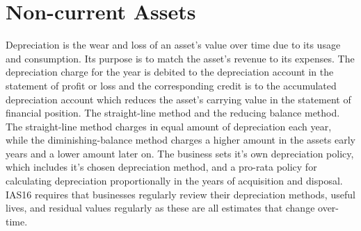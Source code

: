 \section{Non-current Assets}

Depreciation is the wear and loss of an asset’s value over time due to its usage and consumption. Its purpose is to match the asset’s revenue to its expenses. 
The depreciation charge for the year is debited to the depreciation account in the statement of profit or loss and the corresponding credit is to the accumulated depreciation account which reduces the asset’s carrying value in the statement of financial position.
The straight-line method and the reducing balance method. The straight-line method charges in equal amount of depreciation each year, while the diminishing-balance method charges a higher amount in the assets early years and a lower amount later on. 
The business sets it’s own depreciation policy, which includes it’s chosen depreciation method, and a pro-rata policy for calculating depreciation proportionally in the years of acquisition and disposal. IAS16 requires that businesses regularly review their depreciation methods, useful lives, and residual values regularly as these are all estimates that change over-time. 
